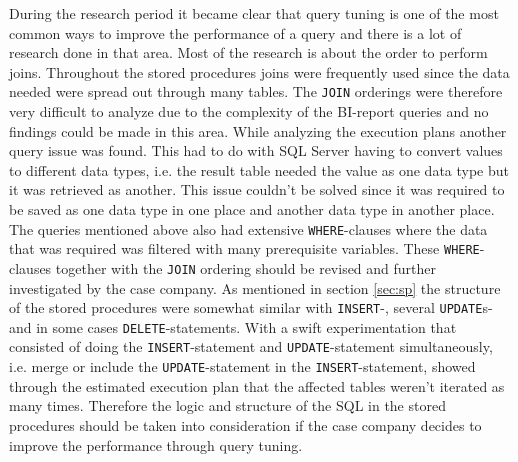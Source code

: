 \documentclass{cslthse-msc}
\begin{document}
During the research period it became clear that query tuning is one of the most common ways to improve the performance of a query and there is a lot of research done in that area. Most of the research is about the order to perform joins. Throughout the stored procedures joins were frequently used since the data needed were spread out through many tables. The \texttt{JOIN} orderings were therefore very difficult to analyze due to the complexity of the BI-report queries and no findings could be made in this area. While analyzing the execution plans another query issue was found. This had to do with SQL Server having to convert values to different data types, i.e. the result table needed the value as one data type but it was retrieved as another. This issue couldn't be solved since it was required to be saved as one data type in one place and another data type in another place. The queries mentioned above also had extensive \texttt{WHERE}-clauses where the data that was required was filtered with many prerequisite variables. These \texttt{WHERE}-clauses together with the \texttt{JOIN} ordering should be revised and further investigated by the case company. As mentioned in section \ref{sec:sp} the structure of the stored procedures were somewhat similar with \texttt{INSERT}-, several \texttt{UPDATE}s- and in some cases \texttt{DELETE}-statements. With a swift experimentation that consisted of doing the \texttt{INSERT}-statement and \texttt{UPDATE}-statement simultaneously, i.e. merge or include the \texttt{UPDATE}-statement in the \texttt{INSERT}-statement, showed through the estimated execution plan that the affected tables weren't iterated as many times. Therefore the logic and structure of the SQL in the stored procedures should be taken into consideration if the case company decides to improve the performance through query tuning.        
\end{document}
